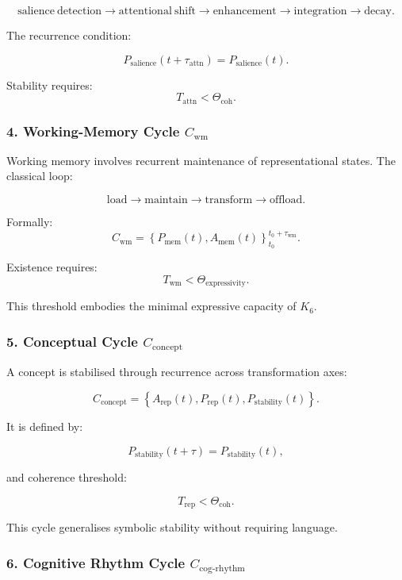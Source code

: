 \[
  \mathrm{salience\ detection}
  \to
  \mathrm{attentional\ shift}
  \to
  \mathrm{enhancement}
  \to
  \mathrm{integration}
  \to
  \mathrm{decay}.
\]

The recurrence condition:

\[
  P_{\mathrm{salience}}(t+\tau_{\mathrm{attn}}) = P_{\mathrm{salience}}(t).
\]

Stability requires:
\[
  T_{\mathrm{attn}} < \Theta_{\mathrm{coh}}.
\]

\subsubsection{4. Working-Memory Cycle $C_{\mathrm{wm}}$}

Working memory involves recurrent maintenance of representational states.
The classical loop:

\[
 \mathrm{load}
 \to
 \mathrm{maintain}
 \to
 \mathrm{transform}
 \to
 \mathrm{offload}.
\]

Formally:
\[
 C_{\mathrm{wm}} = 
 \left\{
   P_{\mathrm{mem}}(t), A_{\mathrm{mem}}(t)
 \right\}_{t_0}^{t_0+\tau_{\mathrm{wm}}}.
\]

Existence requires:
\[
 T_{\mathrm{wm}} < \Theta_{\mathrm{expressivity}}.
\]

This threshold embodies the minimal expressive capacity of $K_6$.

\subsubsection{5. Conceptual Cycle $C_{\mathrm{concept}}$}

A concept is stabilised through recurrence across transformation axes:

\[
  C_{\mathrm{concept}}
    = \left\{
      A_{\mathrm{rep}}(t),
      P_{\mathrm{rep}}(t),
      P_{\mathrm{stability}}(t)
    \right\}.
\]

It is defined by:

\[
  P_{\mathrm{stability}}(t+\tau) = P_{\mathrm{stability}}(t),
\]

and coherence threshold:

\[
  T_{\mathrm{rep}} < \Theta_{\mathrm{coh}}.
\]

This cycle generalises symbolic stability without requiring language.

\subsubsection{6. Cognitive Rhythm Cycle $C_{\mathrm{cog\text{-}rhythm}}$}

